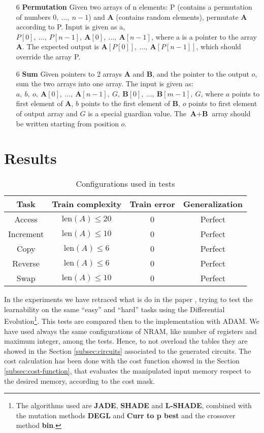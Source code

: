 \begin{itemize}
	\item[6]{\textbf{Permutation} Given two arrays of n elements: P (contains a permutation of numbers $0,\ \dots,\ n-1$) and \textbf{A} (contains random elements), permutate \textbf{A} according to P. Input is given as a, $P[0],\ \dots,\ P[n-1],\ \textbf{A}[0],\ ...,\ \textbf{A}[n-1]$, where a is a pointer to the array \textbf{A}. The expected output is $\textbf{A}[P[0]],\ \dots,\ \textbf{A}[P[n-1]]$, which should override the array P.}
	\item[6]{\textbf{Sum} Given pointers to 2 arrays \textbf{A} and \textbf{B}, and the pointer to the output $o$, sum the two arrays into one array. The input is given as: $a,\ b,\ o,\ \textbf{A}[0],\ \dots,\ \textbf{A}[n-1],\ G,\ \textbf{B}[0],\ \dots,\ \textbf{B}[m-1],\ G$, where $a$ points to first element of \textbf{A}, $b$ points to the first element of \textbf{B}, $o$ points to first element of output array and $G$ is a special guardian value. The $\textbf{A}+\textbf{B}$ array should be written starting from position $o$.}
\end{itemize}

\section{Results}
\begin{table}[]
\centering
\label{my-label} 
\begin{tabular}{|c|c|c|c|}
\hline
\textbf{Task} & \textbf{Train complexity} & \textbf{Train error} & \textbf{Generalization} \\ \hline

Access & $\textrm{len}(A) \leq 20$ & 0 & Perfect \\ \hline
Increment & $\textrm{len}(A) \leq 10$ & 0 & Perfect \\ \hline
Copy & $\textrm{len}(A) \leq 6$ & 0 & Perfect \\ \hline
Reverse & $\textrm{len}(A) \leq 6$ & 0 & Perfect \\ \hline
Swap & $\textrm{len}(A) \leq 10$ & 0 & Perfect \\ \hline

\end{tabular}
\caption{Configurations used in tests}
\label{tbl:tests-configuration}
\end{table}


In the experiments we have retraced what is do in the paper \cite{NRAM:2016}, trying to test the learnability on the same ``easy'' and ``hard'' tasks using the Differential Evolution\footnote{The algorithms used are \textbf{JADE}, \textbf{SHADE} and \textbf{L-SHADE}, combined with the mutation methods \textbf{DEGL} and \textbf{Curr to p best} and the crossover method \textbf{bin}.}. This tests are compared then to the implementation with ADAM. We have used always the same configurations of NRAM, like number of registers and maximum integer, among the tests. Hence, to not overload the tables they are showed in the Section \ref{subsec:circuits} associated to the generated circuits. The cost calculation has been done with the cost function showed in the Section \ref{subsec:cost-function}, that evaluates the manipulated input memory respect to the desired memory, according to the cost mask.

